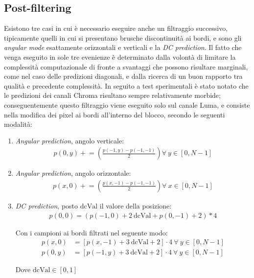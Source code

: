 \subsection{Post-filtering}
Esistono tre casi in cui è necessario eseguire anche un filtraggio successivo, 
tipicamente quelli in cui si presentano brusche discontinuità ai bordi, e sono 
gli \emph{angular mode} esattamente orizzontali e verticali e la 
\emph{DC prediction}.
Il fatto che venga eseguito in sole tre evenienze è determinato dalla volontà 
di limitare la complessità computazionale di fronte a svantaggi che possono 
risultare  marginali, come nel caso delle predizioni diagonali, e dalla ricerca 
di un buon rapporto tra qualità e precedente complessità.
In seguito a test sperimentali è stato notato che le predizioni dei canali 
Chroma risultano sempre relativamente morbide; conseguentemente questo 
filtraggio viene eseguito solo sul canale Luma, e consiste nella modifica dei 
pixel ai bordi all'interno del blocco, secondo le seguenti modalità:
\begin{enumerate}
\item \emph{Angular prediction}, angolo verticale: \\
\begin{align*}
p(0,y)\mathrel{+}=\left(\frac{p(-1,y)-p(-1,-1)}{2}\right) 
\forall\ y \in {[0,N-1]}
\end{align*}

\item \emph{Angular prediction}, angolo orizzontale: \\
\begin{align*}
p(x,0)\mathrel{+}=\left(\frac{p(x,-1)-p(-1,-1)}{2}\right) 
\forall\ x \in {[0,N-1]}
\end{align*}

\item{ \emph{DC prediction}, posto $\text{dcVal}$ il valore della posizione: \\
\begin{align*}
p(0,0)=(p(-1,0)+2\ \text{dcVal}+p(0,-1)+2)*4
\end{align*}

Con i campioni ai bordi filtrati nel seguente modo:
\begin{align*}
p(x,0)&=\left[p(x,-1)+3\ \text{dcVal}+2\right]\cdot4\ \forall\ y \in {[0,N-1]} 
\\
p(0,y)&=\left[p(-1,y)+3\ \text{dcVal}+2\right]\cdot4\ \forall\ y \in {[0,N-1]}
\end{align*}

Dove $\text{dcVal} \in {[0,1]}$
}
\end{enumerate}

